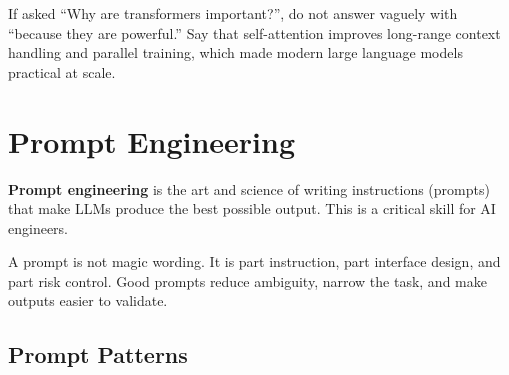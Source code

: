 \documentclass[12pt, a4paper, oneside]{book}
\begin{document}
\begin{examtipbox}
If asked ``Why are transformers important?'', do not answer vaguely with ``because they are powerful.'' Say that self-attention improves long-range context handling and parallel training, which made modern large language models practical at scale.
\end{examtipbox}

\section{Prompt Engineering}

\textbf{Prompt engineering} is the art and science of writing instructions (prompts) that make LLMs produce the best possible output. This is a critical skill for AI engineers.

\begin{notebox}
A prompt is not magic wording. It is part instruction, part interface design, and part risk control. Good prompts reduce ambiguity, narrow the task, and make outputs easier to validate.
\end{notebox}

\subsection{Prompt Patterns}
\end{document}
